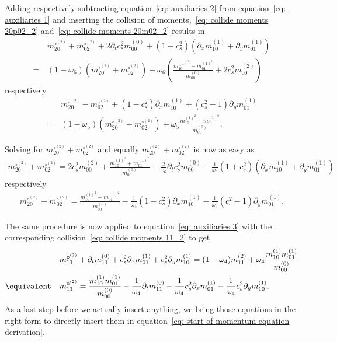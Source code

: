 Adding respectively subtracting equation~\eqref{eq: auxiliaries 2} from equation~\eqref{eq: auxiliaries 1} and inserting the collision of
moments,~\eqref{eq: collide moments 20p02_2} and~\eqref{eq: collide moments 20m02_2} results in
\begin{align}
  \nonumber
  &m_{20}^{\circ^{(2)}} + m_{02}^{\circ^{(2)}} + 2\partial_t c_s^2 m_{00}^{(0)} + (1+c_s^2)(\partial_x m_{10}^{(1)} + \partial_y m_{01}^{(1)})
  \\=\,&
  \label{eq: auxiliaries 4}
  (1-\omega_6)\left(  m_{20}^{\circ^{(2)}} + m_{02}^{\circ^{(2)}}\right)
  + \omega_6 \left( \frac{ m_{10}^{{(1)}^2} + m_{01}^{{(1)}^2}}{m_{00}^{(0)}}
  + 2 c_s^2 m_{00}^{(2)} \right)
\end{align}
respectively
\begin{align}
  \nonumber
  &m_{20}^{\circ^{(2)}} - m_{02}^{\circ^{(2)}} + (1 - c_s^2)\partial_x m_{10}^{(1)} + (c_s^2 - 1)\partial_y m_{01}^{(1)}
  \\=\,&
  \label{eq: auxiliaries 5}
  (1-\omega_5) \left(m_{20}^{\circ^{(2)}}-m_{02}^{\circ^{(2)}}\right) + \omega_5 \frac{ m_{10}^{{(1)}^2} - m_{01}^{{(1)}^2}}{m_{00}^{(0)}}.
\end{align}

Solving for $m_{20}^{\circ^{(2)}} + m_{02}^{\circ^{(2)}}$ and equally $m_{20}^{\circ^{(2)}} + m_{02}^{\circ^{(2)}}$ is now as easy as
\begin{align}
  \label{eq: auxiliaries 6}
  m_{20}^{\circ^{(2)}} + m_{02}^{\circ^{(2)}}
  =
  2 c_s^2 m_{00}^{(2)}
  + \frac{ m_{10}^{{(1)}^2} + m_{01}^{{(1)}^2}}{m_{00}^{(0)}}
  - \frac{2}{\omega_6}\partial_t c_s^2 m_{00}^{(0)}
  - \frac{1}{\omega_6}(1+c_s^2)(\partial_x m_{10}^{(1)} + \partial_y m_{01}^{(1)})
\end{align}
respectively
\begin{align}
  \label{eq: auxiliaries 7}
  m_{20}^{\circ^{(2)}} - m_{02}^{\circ^{(2)}}
  =
   \frac{ m_{10}^{{(1)}^2} - m_{01}^{{(1)}^2}}{m_{00}^{(0)}}
   - \frac{1}{\omega_5} (1 - c_s^2)\partial_x m_{10}^{(1)}
   - \frac{1}{\omega_5} (c_s^2 - 1)\partial_y m_{01}^{(1)}.
\end{align}

The same procedure is now applied to equation~\eqref{eq: auxiliaries 3} with the corresponding collision~\eqref{eq: collide moments 11_2} to get
\begin{align}
  \nonumber
  &m_{11}^{\circ^{(2)}} + \partial_t m_{11}^{(0)} + c_s^2\partial_x m_{01}^{(1)} + c_s^2\partial_y m_{10}^{(1)} =  (1-\omega_4)m_{11}^{(2)} + \omega_4 \frac{ m_{10}^{(1)}m_{01}^{(1)}}{m_{00}^{(0)}}
  \\
  \equivalent\quad
  \label{eq: auxiliaries 8}
  &m_{11}^{\circ^{(2)}}
  =
  \frac{ m_{10}^{(1)}m_{01}^{(1)}}{m_{00}^{(0)}}
  - \frac{1}{\omega_4} \partial_t m_{11}^{(0)}
  - \frac{1}{\omega_4} c_s^2\partial_x m_{01}^{(1)}
  - \frac{1}{\omega_4} c_s^2\partial_y m_{10}^{(1)}
  .
\end{align}
As a last step before we actually insert anything, we bring those equations in the right form to directly insert them in equation~\eqref{eq: start of momentum equation derivation}.

